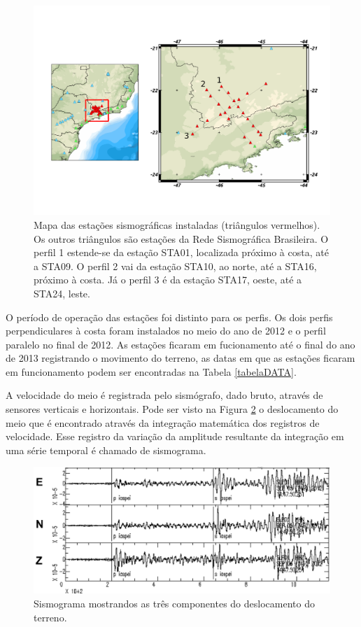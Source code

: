 \begin{figure}[!ht]
\centering
\includegraphics[scale=0.4]{Figs/mapa_das_estacoes_simosgraficas_instaladas.png}
\caption{Mapa das estações sismográficas instaladas (triângulos vermelhos). Os outros triângulos são estações da Rede Sismográfica Brasileira. O perfil 1 estende-se da estação STA01, localizada próximo à costa, até a STA09. O perfil 2 vai da estação STA10, ao norte, até a STA16, próximo à costa. Já o perfil 3 é da estação STA17, oeste, até a STA24, leste.}
\label{map_loc}
\end{figure}

O período de operação das estações foi distinto para os perfis. Os dois perfis perpendiculares à costa foram instalados no meio do ano de 2012 e o perfil paralelo no final de 2012. As estações ficaram em fucionamento até o final do ano de 2013 registrando o movimento do terreno, as datas em que as estações ficaram em funcionamento podem ser encontradas na Tabela \ref{tabelaDATA}. 

A velocidade do meio é registrada pelo sismógrafo, dado bruto, através de sensores verticais e horizontais. Pode ser visto na Figura \ref{simograma} o deslocamento do meio que é encontrado através da integração matemática dos registros de velocidade. Esse registro da variação da amplitude resultante da integração em uma série temporal é chamado de sismograma. 

\begin{figure}[!ht]
\centering
\includegraphics[scale=0.6]{Figs/sismograma.png}
\caption{Sismograma mostrandos as três componentes do deslocamento do terreno.}
\label{simograma}
\end{figure}

